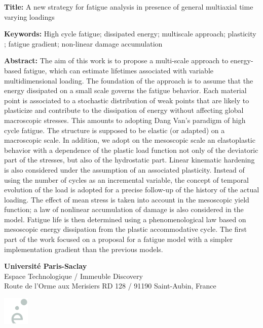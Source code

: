 \begin{flushleft}
\begin{mdframed}
\begin{otherlanguage}{french}
\end{otherlanguage}
\end{mdframed}

\vspace{20pt}

\begin{mdframed}
\textbf{Title:} A new strategy for fatigue analysis in presence of general multiaxial time varying loadings

\textbf{Keywords:} High cycle fatigue; dissipated energy; multiscale approach; plasticity ; fatigue gradient;
non-linear damage accumulation

\textbf{Abstract:} The aim of this work is to propose a multi-scale approach to energy-based fatigue, which can estimate lifetimes associated with variable multidimensional loading. The foundation of the approach is to assume that the energy dissipated on a small scale governs the fatigue behavior. Each material point is associated to a stochastic distribution of weak points that are likely to plasticize and contribute to the dissipation of energy without affecting global macroscopic stresses. This amounts to adopting Dang Van's paradigm of high cycle fatigue. The structure is supposed to be elastic (or adapted) on a macroscopic scale. In addition, we adopt on the mesoscopic scale an elastoplastic behavior with a dependence of the plastic load function not only of the deviatoric part of the stresses, but also of the hydrostatic part. Linear kinematic hardening is also considered under the assumption of an associated plasticity. Instead of using the number of cycles as an incremental variable, the concept of temporal evolution of the load is adopted for a precise follow-up of the history of the actual loading. The effect of mean stress is taken into account in the mesoscopic yield function; a law of nonlinear accumulation of damage is also considered in the model. Fatigue life is then determined using a phenomenological law based on mesoscopic energy dissipation from the plastic accommodative cycle. The first part of the work focused on a proposal for a fatigue model with a simpler implementation gradient than the previous models.


\end{mdframed}
\end{flushleft}

\vfill

\begin{minipage}[b]{0.5\textwidth}
\small
\color{color02}
\textbf{Université Paris-Saclay} \\
Espace Technologique / Immeuble Discovery  \\
Route de l'Orme aux Merisiers RD 128 / 91190 Saint-Aubin, France
\end{minipage}
\hfill
\begin{minipage}[b]{0.35\textwidth}
\hfill
\includegraphics[width=35pt]{figures/SMEMAG2.png}
\end{minipage}